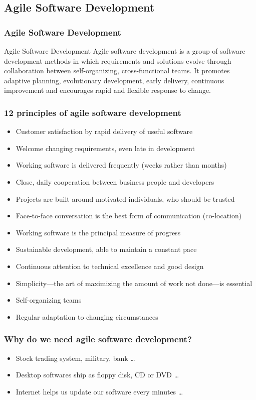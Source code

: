 \documentclass[UTF8]{beamer}
\begin{document}
\subsection{Agile Software Development}

\begin{frame}
  \frametitle{Agile Software Development}
  \begin{block}{Agile Software Development}
    Agile software development is a group of software development methods in which requirements and
    solutions evolve through collaboration between self-organizing, cross-functional teams. It
    promotes adaptive planning, evolutionary development, early delivery, continuous improvement
    and encourages rapid and flexible response to change.
  \end{block}
\end{frame}

\begin{frame}
  \frametitle{12 principles of agile software development}
  \tiny
  \begin{itemize}
    \item Customer satisfaction by rapid delivery of useful software
    \item Welcome changing requirements, even late in development
    \item Working software is delivered frequently (weeks rather than months)
    \item Close, daily cooperation between business people and developers
    \item Projects are built around motivated individuals, who should be trusted
    \item Face-to-face conversation is the best form of communication (co-location)
    \item Working software is the principal measure of progress
    \item Sustainable development, able to maintain a constant pace
    \item Continuous attention to technical excellence and good design
    \item Simplicity—the art of maximizing the amount of work not done—is essential
    \item Self-organizing teams
    \item Regular adaptation to changing circumstances
  \end{itemize}
\end{frame}

\begin{frame}
  \frametitle{Why do we need agile software development?}
  \begin{itemize}
    \item Stock trading system, military, bank \ldots
    \item Desktop softwares ship as floppy disk, CD or DVD \ldots
    \item Internet helps us update our software every minutes \ldots
  \end{itemize}
\end{frame}
\end{document}
